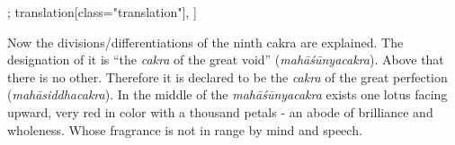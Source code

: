 \documentclass[12pt]{article}%
\begin{document}
\begin{alignment}[
    texts=edition[class="edition"];
    translation[class="translation"],
  ]
\begin{translation}
  \begin{tlate}
Now the divisions/differentiations of the ninth cakra are explained. The designation of it is ``the \textit{cakra} of the great void'' (\textit{mahāśūnyacakra}). Above that there is no other. Therefore it is declared to be the \textit{cakra} of the great perfection (\textit{mahāsiddhacakra}). In the middle of the \textit{mahāśūnyacakra} exists one lotus facing upward, very red in color with a thousand petals - an abode of brilliance and wholeness. Whose fragrance is not in range by mind and speech. 
  \end{tlate}
   \end{translation}
 \end{alignment}
\end{document}
